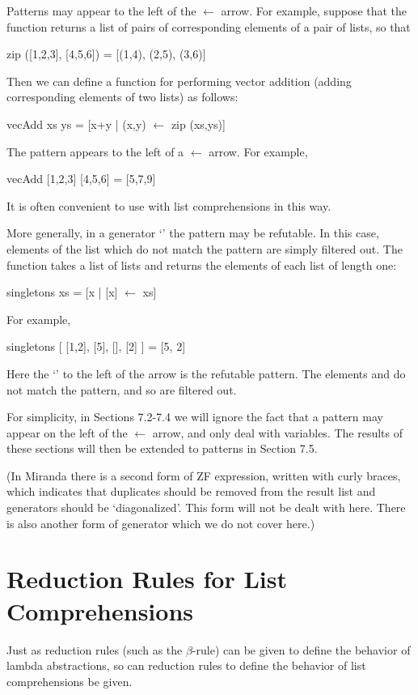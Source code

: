 Patterns may appear to the left of the $\leftarrow$ arrow. For example, suppose that
the function  returns a list of pairs of corresponding elements of a pair of
lists, so that
\begin{mlcoded}
    zip ([1,2,3], [4,5,6]) = [(1,4), (2,5), (3,6)]
\end{mlcoded}
Then we can define a function  for performing vector addition (adding
corresponding elements of two lists) as follows:
\begin{mlcoded}
    vecAdd xs ys = [x+y | (x,y) $\leftarrow$ zip (xs,ys)]
\end{mlcoded}
The pattern  appears to the left of a $\leftarrow$ arrow. For example,
\begin{mlcoded}
    vecAdd [1,2,3] [4,5,6] = [5,7,9]
\end{mlcoded}
It is often convenient to use  with list comprehensions in this way.

More generally, in a generator `' the pattern  may be refutable. In
this case, elements of the list  which do not match the pattern are simply
filtered out. The function  takes a list of lists and returns the
elements of each list of length one:
\begin{mlcoded}
    singletons xs = [x | [x] $\leftarrow$ xs]
\end{mlcoded}
For example,
\begin{mlcoded}
    singletons [ [1,2], [5], [\;], [2] ] = [5, 2]
\end{mlcoded}
Here the `\ml{[x]}' to the left of the arrow is the refutable pattern. The elements
\ml{[1,2]} and \ml{[\;]} do not match the pattern, and so are filtered out.

For simplicity, in Sections 7.2-7.4 we will ignore the fact that a pattern may
appear on the left of the $\leftarrow$ arrow, and only deal with variables. The results of
these sections will then be extended to patterns in Section 7.5.

(In Miranda there is a second form of ZF expression, written with curly
braces, which indicates that duplicates should be removed from the result list
and generators should be `diagonalized'. This form will not be dealt with
here. There is also another form of generator which we do not cover here.)

\section{Reduction Rules for List Comprehensions}
Just as reduction rules (such as the $\beta$-rule) can be given to define the behavior
of lambda abstractions, so can reduction rules to define the behavior of list
comprehensions be given.

